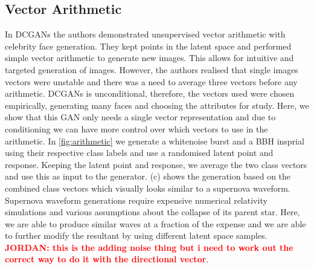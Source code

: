 \documentclass[12pt]{iopart}
\newcommand{\jordan}[1]{\textbf{\textcolor{red}{JORDAN: #1}}}
\begin{document}

\subsection{Vector Arithmetic}
In DCGANs the authors demonstrated unsupervised vector arithmetic with celebrity face generation. They kept points in the latent space and performed simple vector arithmetic to generate new images. This allows for intuitive and targeted generation of images. However, the authors realised that single images vectors were unstable and there was a need to average three vectors before any arithmetic. DCGANs is unconditional, therefore, the vectors used were chosen empirically, generating many faces and choosing the attributes for study. Here, we show that this GAN only needs a single vector representation and due to conditioning we can have more control over which vectors to use in the arithmetic. In \cref{fig:arithmetic} we generate a whitenoise burst and a BBH insprial using their respective class labels and use a randomised latent point and response. Keeping the latent point and response, we average the two class vectors and use this as input to the generator.  (c) shows the generation based on the combined class vectors which visually looks similar to a supernova waveform. Supernova waveform generations require expensive numerical relativity simulations and various assumptions about the collapse of its parent star. Here, we are able to produce similar waves at a fraction of the expense and we are able to further modify the resultant by using different latent space samples. \jordan{this is the adding noise thing but i need to work out the correct way to do it with the directional vector}. 
\end{document}
